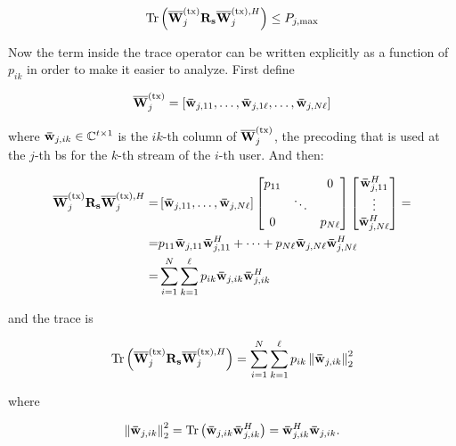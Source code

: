 \begin{equation} \label{eq:pbpc_constraint}
	\operatorname*{Tr} \left( \mathbf{\overline{W}}^{(\text{tx})}_j\mathbf{R}_{\mathbf{s}}\mathbf{\overline{W}}^{(\text{tx}),H}_j \right) \leq P_{j,\max}
\end{equation}

Now the term inside the trace operator can be written explicitly as a function
of $p_{ik}$ in order to make it easier to analyze. First define

\begin{equation} \label{eq:precoding_bs_columns}
	\mathbf{\overline{W}}^{(\text{tx})}_j = \left[ \mathbf{\bar{w}}_{j,11}, \ldots, \mathbf{\bar{w}}_{j, 1\ell}, \ldots,
	\mathbf{\bar{w}}_{j,N\ell} \right]
\end{equation}

\noindent
where $\mathbf{\bar{w}}_{j, ik} \in \mathbb{C}^{t \times 1}$ is the $ik$-th column of $\mathbf{\overline{W}}^{(\text{tx})}_j$,
\ie the precoding that is used at the $j$-th \gls{bs} for the $k$-th
stream of the $i$-th user.
And then:

\begin{equation}
\begin{aligned}
	\mathbf{\overline{W}}^{(\text{tx})}_j\mathbf{R}_{\mathbf{s}}\mathbf{\overline{W}}^{(\text{tx}),H}_j = &\left[\mathbf{\bar{w}}_{j,11}, \ldots, \mathbf{\bar{w}}_{j, N\ell}
	\right]
	\begin{bmatrix}
		p_{11} &        & 0\\
               & \ddots &  \\
		0      &        & p_{N\ell}

	\end{bmatrix}
	\begin{bmatrix}
		\mathbf{\bar{w}}_{j,11}^H\\
		\vdots\\
		\mathbf{\bar{w}}_{j,N\ell}^H
	\end{bmatrix} = \\
	= & p_{11}\mathbf{\bar{w}}_{j,11}\mathbf{\bar{w}}_{j,11}^H + \cdots + p_{N\ell}\mathbf{\bar{w}}_{j,N\ell}
	\mathbf{\bar{w}}_{j,N\ell}^H \\
	= & \sum\limits_{i = 1}^N\sum\limits_{k = 1}^\ell p_{ik}
	\mathbf{\bar{w}}_{j,ik}\mathbf{\bar{w}}_{j,ik}^H
\end{aligned}
\end{equation}

\noindent
and the trace is

\begin{equation} \label{eq:trace_terms_p_i}
	\operatorname*{Tr}\left(\mathbf{\overline{W}}^{(\text{tx})}_j \mathbf{R}_{\mathbf{s}} \mathbf{\overline{W}}^{(\text{tx}),H}_j\right) = \sum\limits_{i = 1}^N
	\sum\limits_{k = 1}^\ell p_{ik} \left\| \mathbf{\bar{w}}_{j, ik} \right\|_2^2
\end{equation}

\noindent
where

\begin{equation} \label{eq:norm2}
    \left\|\mathbf{\bar{w}}_{j,ik}\right\|_2^2 = \operatorname*{Tr}\left( \mathbf{\bar{w}}_{j,ik} \mathbf{\bar{w}}_{j,ik}^H
    \right) = \mathbf{\bar{w}}_{j,ik}^H \mathbf{\bar{w}}_{j,ik}.
\end{equation}

